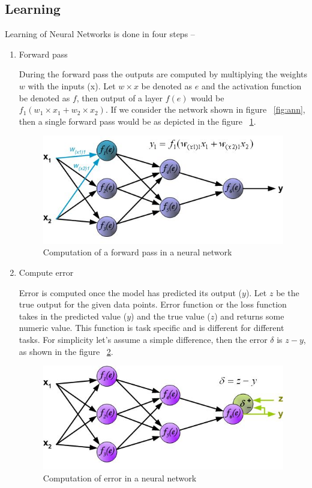 \subsection{Learning}

Learning of Neural Networks is done in four steps --

\begin{enumerate}
	\item Forward pass

During the forward pass the outputs are computed by multiplying the weights $w$ with the inputs (x). Let $w \times x$ be denoted as $e$ and the activation function be denoted as $f$, then output of a layer $f(e)$ would be $f_1(w_1 \times x_1 + w_2 \times x_2)$. 
If we consider the network shown in figure ~\ref{fig:ann}, then a single forward pass would be as depicted in the figure ~\ref{fig:forward}.

\begin{figure}[H]
	\centering
   \includegraphics[scale=0.66]{figures/intro/forward.bmp}
   \caption[Forward pass]{Computation of a forward pass in a neural network}
   \label{fig:forward}
\end{figure}

	\item Compute error

Error is computed once the model has predicted its output ($y$). Let $z$ be the true output for the given data points. 
Error function or the loss function takes in the predicted value ($y$) and the true value ($z$) and returns some numeric value.
This function is task specific and is different for different tasks. For simplicity let's assume a simple difference, then the error $\delta$ is $z-y$, as shown in the figure ~\ref{fig:error}.

\begin{figure}[H]
	\centering
   \includegraphics[scale=0.66]{figures/intro/error.bmp}
   \caption[Compute error]{Computation of error in a neural network}
   \label{fig:error}
\end{figure}



\end{enumerate}
